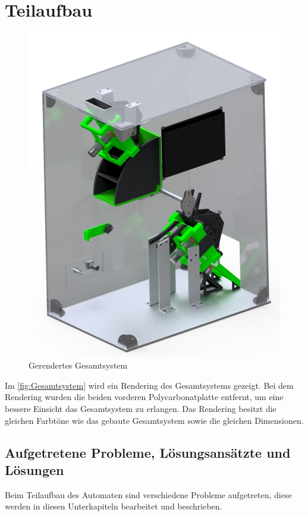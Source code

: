 \section{Teilaufbau}
\begin{figure}[H]
    \centering
    \includegraphics[scale=0.7,page=1]{fig/mech/ReShuffledCombined}
    \caption{Gerendertes Gesamtsystem}
    \label{fig:Gesamtsystem}
\end{figure}

Im \autoref{fig:Gesamtsystem} wird ein Rendering des Gesamtsystems gezeigt.
Bei dem Rendering wurden die beiden vorderen Polycarbonatplatte entfernt, um eine bessere Einsicht
das Gesamtsystem zu erlangen.
Das Rendering besitzt die gleichen Farbtöne wie das gebaute Gesamtsystem sowie die gleichen Dimensionen.

\subsection{Aufgetretene Probleme, Lösungsansätzte und Lösungen}
Beim Teilaufbau des Automaten sind verschiedene Probleme aufgetreten, diese werden in diesen Unterkapiteln bearbeitet und beschrieben.


